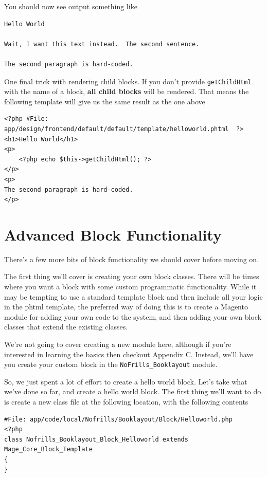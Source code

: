 \documentclass[oneside]{book}
\begin{document}
You should now see output something like

\begin{lstlisting}
Hello World

Wait, I want this text instead.  The second sentence.

The second paragraph is hard-coded.

\end{lstlisting}


One final trick with rendering child blocks.  If you don't provide \footnotesize\texttt{getChildHtml} \normalsize  with the name of a block, \textbf{all child blocks} will be rendered.  That means the following template will give us the same result as the one above

\begin{lstlisting}
<?php #File: app/design/frontend/default/default/template/helloworld.phtml  ?>
<h1>Hello World</h1>
<p>
    <?php echo $this->getChildHtml(); ?>
</p>
<p>
The second paragraph is hard-coded.
</p>

\end{lstlisting}


\section{Advanced Block Functionality}

There's a few more bits of block functionality we should cover before moving on.

The first thing we'll cover is creating your own block classes.  There will be times where you want a block with some custom programmatic functionality.  While it may be tempting to use a standard template block and then include all your logic in the phtml template, the preferred way of doing this is to create a Magento module for adding your own code to the system, and then adding your own block classes that extend the existing classes.

We're not going to cover creating a new module here, although if you're interested in learning the basics then checkout Appendix C.  Instead, we'll have you create your custom block in the \footnotesize\texttt{NoFrills\_Booklayout} \normalsize  module.

So, we just spent a lot of effort to create a hello world block.  Let's take what we've done so far, and create a hello world block.  The first thing we'll want to do is create a new class file at the following location, with the following contents

\begin{lstlisting}
#File: app/code/local/Nofrills/Booklayout/Block/Helloworld.php
<?php
class Nofrills_Booklayout_Block_Helloworld extends Mage_Core_Block_Template
{
}

\end{lstlisting}
\end{document}
